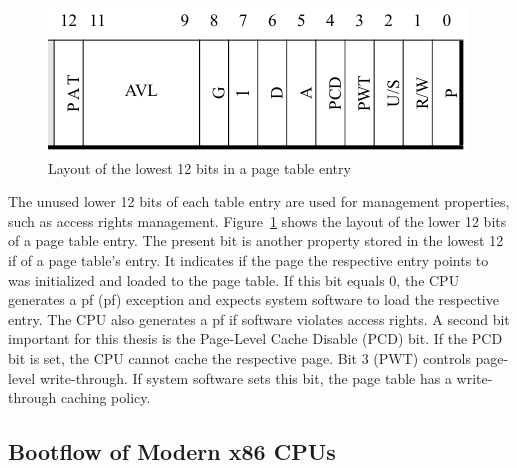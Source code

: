 \begin{figure}
    \begin{center}
        \includegraphics[width=.6\textwidth]{images/paging_rights_placeholder.png}
        \caption{Layout of the lowest 12 bits in a page table entry}
        \label{fig:state:technical:paging_rights}
    \end{center}
\end{figure}

The unused lower 12 bits of each table entry are used for management properties,
such as access rights management. Figure~\ref{fig:state:technical:paging_rights}
shows the layout of the lower 12 bits of a page table entry. The present bit is
another property stored in the lowest 12 if of a page table's entry. It
indicates if the page the respective entry points to was initialized and loaded
to the page table. If this bit equals 0, the CPU generates a \gls{pf}
(\gls{pf}) exception and expects system software to load the respective
entry. The CPU also generates a \gls{pf} if software violates access
rights. A second bit important for this thesis is the Page-Level Cache Disable
(PCD) bit. If the PCD bit is set, the CPU cannot cache the respective page. Bit
3 (PWT) controls page-level write-through. If system software sets this bit, the
page table has a write-through caching policy.

\subsection{Bootflow of Modern x86 CPUs}
\label{sec:state:technical:boot}
